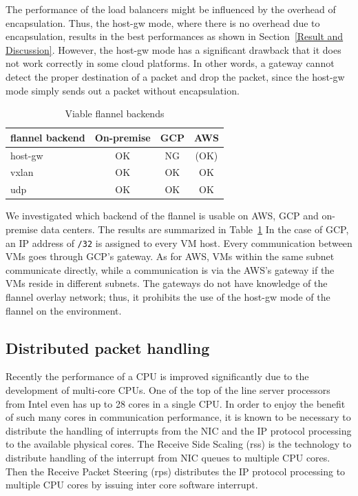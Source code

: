 The performance of the load balancers might be influenced by the overhead of encapsulation. 
Thus, the host-gw mode, where there is no overhead due to encapsulation, 
results in the best performances as shown in Section~\ref{Result and Discussion}.
However, the host-gw mode has a significant drawback that it does not work correctly in some cloud platforms. 
In other words, a gateway cannot detect the proper destination of a packet and drop the packet, 
since the host-gw mode simply sends out a packet without encapsulation.

\begin{table}
  \begin{tabular}{lccc}
    \toprule
    flannel backend & On-premise & GCP & AWS \\
    \midrule
    host-gw & OK & NG & (OK) \\
    vxlan & OK & OK & OK \\
    udp & OK & OK & OK \\
    \bottomrule
\end{tabular}
  \caption{Viable flannel backends}
  \label{tab:Viable flannel backends}
\end{table}

We investigated which backend of the flannel is usable on AWS, GCP and on-premise data centers.
The results are summarized in Table~\ref{tab:Viable flannel backends}
%
In the case of GCP, an IP address of {\tt /32} is assigned to every VM host.
Every communication between VMs goes through GCP's gateway.
As for AWS, VMs within the same subnet communicate directly, while
a communication is via the AWS's gateway if the VMs reside in different subnets.
The gateways do not have knowledge of the flannel overlay network; thus, it prohibits the use of the host-gw mode of the flannel on the environment.  


\subsection{Distributed packet handling}

Recently the performance of a CPU is improved significantly due to the development of multi-core CPUs.
One of the top of the line server processors from Intel even has up to 28 cores in a single CPU.
In order to enjoy the benefit of such many cores in communication performance, 
it is known to be necessary to distribute the handling of interrupts from the NIC and the IP protocol processing
to the available physical cores.
The Receive Side Scaling (rss)\cite{TomHerbert} is the technology 
to distribute handling of the interrupt from NIC queues to multiple CPU cores.
Then the Receive Packet Steering (rps)\cite{TomHerbert} distributes the IP protocol processing 
to multiple CPU cores by issuing inter core software interrupt.

